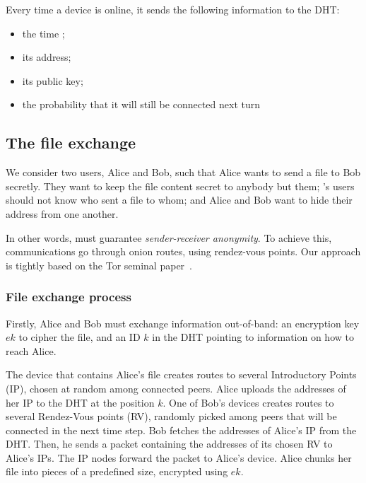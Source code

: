 Every time a device is online, it sends the following information to the DHT:
\begin{itemize}
	\item the time ;
	\item its address;
	\item its public key;
	\item the probability that it will still be connected next turn 
\end{itemize}


\subsection{The file exchange}%
\label{file-exchange}

We consider two users, Alice and Bob, such that Alice wants to send a file to Bob secretly.
They want to keep the file content secret to anybody but them; \name's users should not know who sent a file to whom; and Alice and Bob want to hide their address from one another.

In other words, \name must guarantee \emph{sender-receiver anonymity}.
To achieve this, communications go through onion routes, using rendez-vous points.
Our approach is tightly based on the Tor seminal paper~\cite{Tor}.

\subsubsection{File exchange process}%
\label{ssub:file_exchange_process}

Firstly, Alice and Bob must exchange information out-of-band: an encryption key $ek$ to cipher the file, and an ID $k$ in the DHT pointing to information on how to reach Alice.

The device that contains Alice's file  creates routes to several Introductory Points (IP), chosen at random among connected peers.
Alice uploads the addresses of her IP to the DHT at the position $k$.
One of Bob's devices creates routes to several Rendez-Vous points (RV), randomly picked among peers that will be connected in the next time step.
Bob fetches the addresses of Alice's IP from the \ac{DHT}.
Then, he sends a packet containing the addresses of its chosen RV to Alice's IPs.
The IP nodes forward the packet to Alice's device. 
Alice chunks her file into pieces of a predefined size, encrypted using $ek$.

